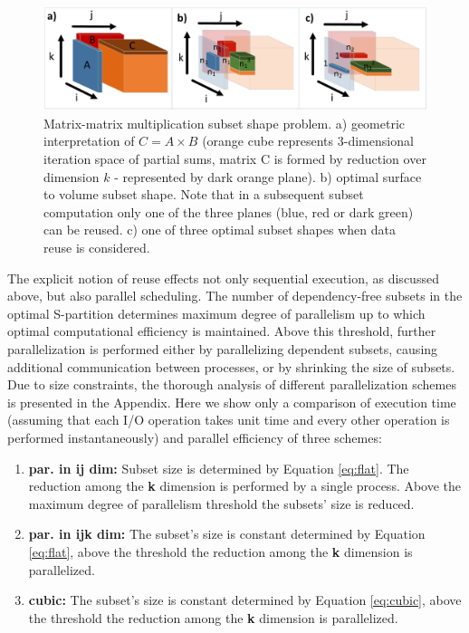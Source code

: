 \documentclass[sigconf]{acmart}
\begin{document}
\begin{figure}
	\includegraphics[width=\columnwidth]{figures/mmm_reuse}
	\caption{Matrix-matrix multiplication subset shape problem. a) 
		geometric interpretation of $C = A \times B$ (orange cube represents 
		3-dimensional iteration space of partial sums, matrix C is formed by 
		reduction over dimension $k$ - represented by dark orange plane). b) 
		optimal surface to volume subset shape. Note that in a subsequent 
		subset computation only one of the three planes (blue, red or dark 
		green) can be reused. c) one of three optimal subset shapes when 
		data reuse is considered.}
	\label{fig:mmmreuse}
\end{figure}

The explicit notion of reuse effects not only sequential execution, as 
discussed above, but also parallel scheduling. The number of dependency-free 
subsets in the optimal S-partition determines maximum degree of parallelism up 
to which optimal computational efficiency is maintained. Above this threshold, 
further parallelization is performed either by parallelizing dependent subsets, 
causing additional communication between processes, or by shrinking the size of 
subsets.
 Due to size constraints, the thorough analysis of different parallelization 
 schemes is presented in the Appendix.  Here we show only a comparison of 
 execution time (assuming that each I/O operation takes unit time and every 
 other operation is performed instantaneously) and parallel efficiency of three 
 schemes: 
\begin{enumerate}
	\item \textbf{par. in ij dim:} Subset size is determined by Equation 
	\ref{eq:flat}. 
	The reduction among the \textbf{k} 
	dimension is performed by a single process. Above the maximum degree of 
	parallelism threshold the 
	subsets' size is reduced.
	\item \textbf{par. in ijk dim:} The subset's size is constant determined by 
	Equation \ref{eq:flat}, above the 
	threshold the reduction among the \textbf{k} dimension is parallelized.
	\item \textbf{cubic:} The subset's size is constant determined by Equation 
	\ref{eq:cubic}, above the threshold 
	the reduction among the \textbf{k} dimension is parallelized.
\end{enumerate}
\end{document}
